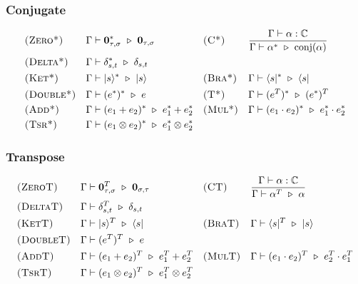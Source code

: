\subsubsection*{Conjugate}
\begin{align*}
  & \textsc{(Zero*)} && \Gamma \vdash \textbf{0}_{\tau, \sigma}^* \ \triangleright\  \textbf{0}_{\tau, \sigma}
  && \textsc{(C*)} && \frac{\Gamma \vdash \alpha : \mathbb{C}}{\Gamma \vdash \alpha^* \ \triangleright\ \mathrm{conj}(\alpha)} \\
  & \textsc{(Delta*)} &&
  \Gamma \vdash \delta_{s,t}^* \ \triangleright\  \delta_{s,t}\\
  & \textsc{(Ket*)} && \Gamma \vdash |s\rangle^* \ \triangleright\  |s\rangle
  && \textsc{(Bra*)} && \Gamma \vdash \langle s|^* \ \triangleright\  \langle s| \\
  & \textsc{(Double*)} && \Gamma \vdash (e^*)^*\ \triangleright\  e
  && \textsc{(T*)} && \Gamma \vdash (e^T)^* \ \triangleright\ (e^*)^T \\
  & \textsc{(Add*)} && \Gamma \vdash (e_1 + e_2)^* \ \triangleright\  e_1^* + e_2^* 
  && \textsc{(Mul*)} && \Gamma \vdash (e_1 \cdot e_2)^* \ \triangleright\  e_1^* \cdot e_2^* \\
  & \textsc{(Tsr*)} && \Gamma \vdash (e_1 \otimes e_2)^* \ \triangleright\  e_1^* \otimes e_2^*
\end{align*}

\subsubsection*{Transpose}
\begin{align*}
  & \textsc{(ZeroT)} && \Gamma \vdash \textbf{0}_{\tau, \sigma}^T \ \triangleright\  \textbf{0}_{\sigma, \tau}
  && \textsc{(CT)} && \frac{\Gamma \vdash \alpha : \mathbb{C}}{\Gamma \vdash \alpha^T \ \triangleright\  \alpha} \\
  & \textsc{(DeltaT)} && \Gamma \vdash \delta_{s,t}^T \ \triangleright\  \delta_{s,t} \\
  & \textsc{(KetT)} && \Gamma \vdash |s\rangle^T \ \triangleright\  \langle s| 
  && \textsc{(BraT)} && \Gamma \vdash \langle s|^T \ \triangleright\  |s\rangle \\
  & \textsc{(DoubleT)} && \Gamma \vdash (e^T)^T \ \triangleright\  e \\
  & \textsc{(AddT)} && \Gamma \vdash (e_1 + e_2)^T \ \triangleright\  e_1^T + e_2^T
  && \textsc{(MulT)} && \Gamma \vdash (e_1 \cdot e_2)^T \ \triangleright\  e_2^T \cdot e_1^T \\
  & \textsc{(TsrT)} && \Gamma \vdash (e_1 \otimes e_2)^T \ \triangleright\  e_1^T \otimes e_2^T
\end{align*}

